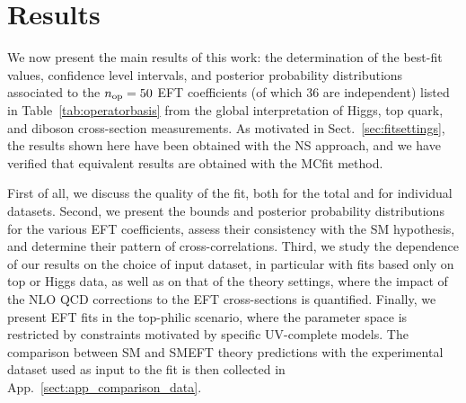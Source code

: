 \section{Results}
\label{sec:results}

We now present the main results of this work:
the determination of the best-fit values,
confidence level intervals, and posterior probability distributions
associated to the $n_{\rm op}=50$ EFT coefficients (of which 36 are independent) listed in
Table~\ref{tab:operatorbasis} from the global
interpretation of Higgs, top quark, and diboson cross-section measurements.
%
As motivated in Sect.~\ref{sec:fitsettings}, the results
shown here have been obtained with the NS approach, and we have verified that
equivalent results are obtained with the MCfit method.

First of all, we discuss the quality of the fit,
both for the total and for individual
datasets.
%
Second, we present the bounds and posterior probability distributions
for the various EFT coefficients, assess their consistency with the
SM hypothesis, and determine their pattern of cross-correlations.
%
Third, we study the dependence of our results on the choice of input dataset,
in particular with fits based only on top or Higgs data, as well as on that of the theory settings,
where the impact of the NLO QCD corrections to the EFT cross-sections is quantified.
%
Finally, we present EFT fits  in the top-philic scenario, where the parameter space
is restricted by constraints motivated by specific UV-complete models.
%
The comparison between SM and SMEFT theory predictions
with the experimental dataset used as input to
the fit is then collected in App.~\ref{sect:app_comparison_data}.










